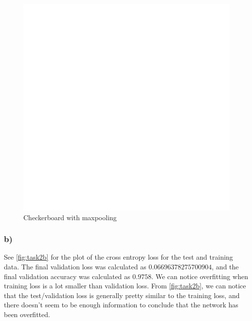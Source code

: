 \begin{figure}[]
    \centering
    \includegraphics[width=1.00\textwidth]{figures/image_processed/checkerboard_maxpooled.png}
    \caption{Checkerboard with maxpooling}
    \label{fig:checkerboard_maxpooled}
\end{figure}

\subsubsection*{b)}
See \cref{fig:task2b} for the plot of the cross entropy loss for the test and training data. The final validation loss was calculated as $0.06696378275700904$, and the final validation accuracy was calculated as $0.9758$. We can notice overfitting when training loss is a lot smaller than validation loss. From \cref{fig:task2b}, we can notice that the test/validation loss is generally pretty similar to the training loss, and there doesn't seem to be enough information to conclude that the network has been overfitted. 

